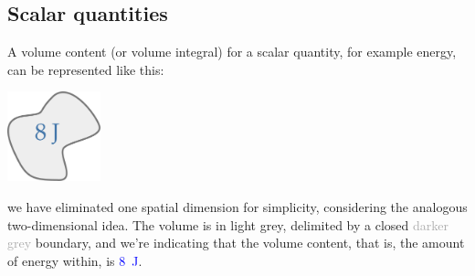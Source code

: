 \documentclass[a4paper,12pt,%
onecolumn,oneside,%
british%
]{memoir}
\renewcommand*{\|}[1][]{\nonscript\:#1\vert\nonscript\:\mathopen{}}
\begin{document}
\subsection{Scalar quantities}

A volume content (or volume integral) for a scalar quantity, for example energy, can be represented like this:
\begin{center}
  \includegraphics[align=t,height=7em]{images/volumeintegral_8J.pdf}
\end{center}
we have eliminated one spatial dimension for simplicity, considering the analogous two-dimensional idea. The volume is in \textcolor{midgrey}{light grey}, delimited by a closed \textcolor{darkgrey}{darker grey} boundary, and we're indicating that the volume content, that is, the amount of energy within, is \textcolor{blue}{\qty{8}{J}}.
\end{document}
